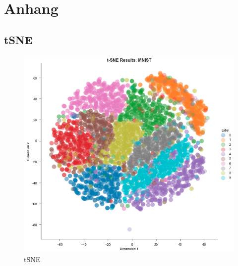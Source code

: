 \newpage
\appendix
\chapter{Anhang}

\section{tSNE}
\label{fig:automatisierungs-schema-gesamt}
\begin{figure}[h]
   \centering
   \includegraphics[scale=0.5]{assets/images/tSNE.png}
   \caption{tSNE}
\end{figure}